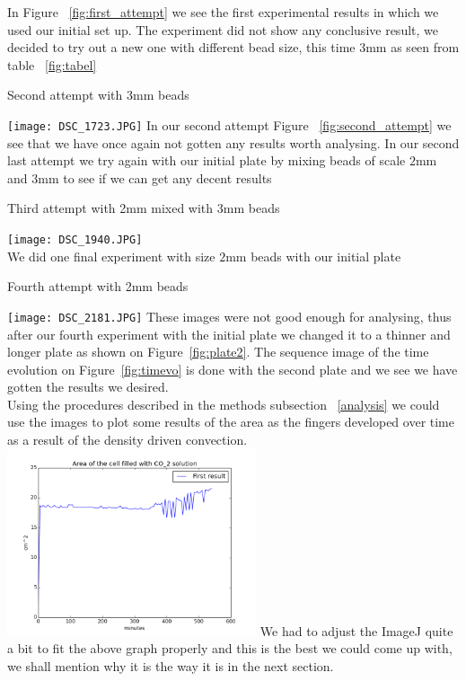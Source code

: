 \documentclass[twoside]{article}
\begin{document}
\begin{multicols}{2}
In Figure ~\ref{fig:first_attempt} we see the first experimental results in which we used our initial set up. The experiment did not show any conclusive result, we decided to try out a new one with different bead size, this time $3$mm as seen from table ~\ref{fig:tabel}
\caption{Second attempt with 3mm beads}
\texttt{[image: DSC\_1723.JPG]}\label{fig:second_attempt}
\vspace{0.2cm}
In our second attempt Figure ~\ref{fig:second_attempt} we see that we have once again not gotten any results worth analysing. In our second last attempt we try again with our initial plate by mixing beads of scale $2$mm and $3$mm to see if we can get any decent results
\caption{Third attempt with 2mm mixed with 3mm beads}
\texttt{[image: DSC\_1940.JPG]}\label{fig:third_attempt}
\vspace{0.2cm}\\
We did one final experiment with size $2$mm beads with our initial plate
\caption{Fourth attempt with 2mm beads}
\texttt{[image: DSC\_2181.JPG]}\label{fig:fourth_attempt}
\vspace{0.2cm}
\newpage
These images were not good enough for analysing, thus after our fourth experiment with the initial plate we changed it to a thinner and longer plate as shown on Figure~\ref{fig:plate2}. The sequence image of the time evolution on Figure~\ref{fig:timevo} is done with the second plate and we see we have gotten the results we desired. \\
Using the procedures described in the methods subsection ~\ref{analysis} we could use the images to plot some results of the area as the fingers developed over time as a result of the density driven convection. 
\includegraphics[width=0.55\textwidth]{area_1.png}\label{fig:area1_bad}
\vspace{0.3cm}
We had to adjust the ImageJ quite a bit to fit the above graph properly and this is the best we could come up with, we shall mention why it is the way it is in the next section. 

\end{multicols}
\end{document}
